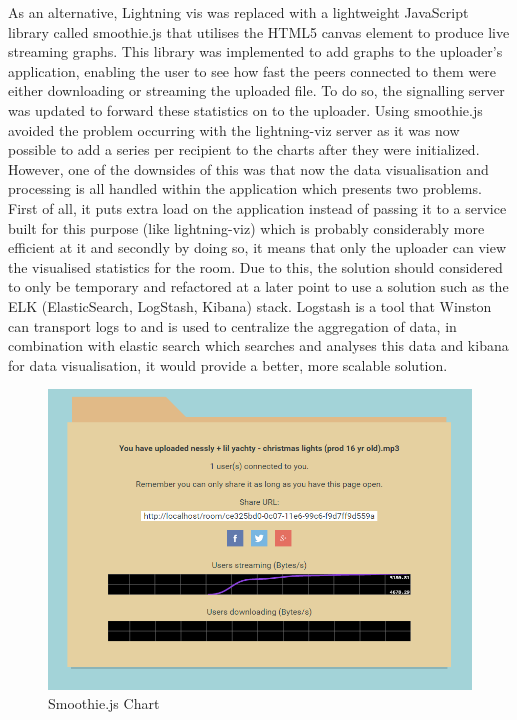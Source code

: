 \documentclass[]{report}
\begin{document}
				As an alternative, Lightning vis was replaced with a lightweight JavaScript library called smoothie.js that utilises the HTML5 canvas element to produce live streaming graphs. This library was implemented to add graphs to the uploader's application, enabling the user to see how fast the peers connected to them were either downloading or streaming the uploaded file. To do so, the signalling server was updated to forward these statistics on to the uploader. Using smoothie.js avoided the problem occurring with the lightning-viz server as it was now possible to add a series per recipient to the charts after they were initialized. However, one of the downsides of this was that now the data visualisation and processing is all handled within the application which presents two problems. First of all, it puts extra load on the application instead of passing it to a service built for this purpose (like lightning-viz) which is probably considerably more efficient at it and secondly by doing so, it means that only the uploader can view the visualised statistics for the room. Due to this, the solution should considered to only be temporary and refactored at a later point to use a solution such as the ELK (ElasticSearch, LogStash, Kibana) stack. Logstash is a tool that Winston can transport logs to and is used to centralize the aggregation of data, in combination with elastic search which searches and analyses this data and kibana for data visualisation, it would provide a better, more scalable solution.
				
				\begin{figure}[H]
					\caption{Smoothie.js Chart}
					\centering
					\includegraphics[scale=0.5]{smoothie-js.png}
				\end{figure}
			
\end{document}
